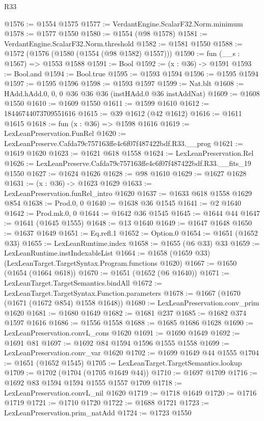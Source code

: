 \begin{lexlean}{R33}
\begin{coremodule}
@1576 := @1554 @1575
@1577 := VerdantEngine.ScalarF32.Norm.minimum
@1578 := @1577 @1550
@1580 := @1554 (@98 @1578)
@1581 := VerdantEngine.ScalarF32.Norm.threshold
@1582 := @1581 @1550
@1588 := @1572 (@1576 (@1580 (@1554 (@98 @1582) @1557)))
@1590 := fun (__s : @1567) => @1553 @1588
@1591 := Bool
@1592 := (x : @36) -> @1591
@1593 := Bool.and
@1594 := Bool.true
@1595 := @1593 @1594
@1596 := @1595 @1594
@1597 := @1595 @1596
@1598 := @1593 @1597
@1599 := Nat.blt
@1608 := HAdd.hAdd.{0, 0, 0} @36 @36 @36 (instHAdd.{0} @36 instAddNat)
@1609 := @1608 @1550
@1610 := @1609 @1550
@1611 := @1599 @1610
@1612 := 18446744073709551616
@1615 := @39 @1612 (@42 @1612)
@1616 := @1611 @1615
@1618 := fun (x : @36) => @1598 @1616
@1619 := LexLeanPreservation.FunRel
@1620 := LexLeanPreserve.Cafda79c757163ffe4c6f07f487422bdf.R33.__prog
@1621 := @1619 @1620
@1623 := @1621 @618 @1558
@1624 := LexLeanPreservation.Rel
@1626 := LexLeanPreserve.Cafda79c757163ffe4c6f07f487422bdf.R33.__fits_19 @1550
@1627 := @1624 @1626
@1628 := @98 @1610
@1629 := @1627 @1628
@1631 := (x : @36) -> @1623 @1629
@1633 := LexLeanPreservation.funRel_intro @1620
@1637 := @1633 @618 @1558 @1629 @854
@1638 := Prod.{0, 0}
@1640 := @1638 @36 @1545
@1641 := @2 @1640
@1642 := Prod.mk.{0, 0}
@1644 := @1642 @36 @1545
@1645 := @1644 @44
@1647 := @1641 (@1645 @1555)
@1648 := @13 @1640
@1649 := @1647 @1648
@1650 := @1637 @1649
@1651 := Eq.refl.{1}
@1652 := Option.{0}
@1654 := @1651 (@1652 @33)
@1655 := LexLeanRuntime.index
@1658 := @1655 (@6 @33) @33
@1659 := LexLeanRuntime.instIndexableList
@1664 := @1658 (@1659 @33) (LexLeanTarget.TargetSyntax.Program.functions @1620)
@1667 := @1650 (@1654 (@1664 @618))
@1670 := @1651 (@1652 (@6 @1640))
@1671 := LexLeanTarget.TargetSemantics.bindAll
@1672 := LexLeanTarget.TargetSyntax.Function.parameters
@1678 := @1667 (@1670 (@1671 (@1672 @854) @1558 @1648))
@1680 := LexLeanPreservation.conv_prim @1620
@1681 := @1680 @1649
@1682 := @1681 @237
@1685 := @1682 @374 @1597 @1616
@1686 := @1556 @1558
@1688 := @1685 @1686 @1628
@1690 := LexLeanPreservation.convL_cons @1620
@1691 := @1690 @1649
@1692 := @1691 @81
@1697 := @1692 @84 @1594 @1596 @1555 @1558
@1699 := LexLeanPreservation.conv_var @1620
@1702 := @1699 @1649 @44 @1555
@1704 := @1651 (@1652 @1545)
@1705 := LexLeanTarget.TargetSemantics.lookup
@1709 := @1702 (@1704 (@1705 @1649 @44))
@1710 := @1697 @1709
@1716 := @1692 @83 @1594 @1594 @1555 @1557 @1709
@1718 := LexLeanPreservation.convL_nil @1620
@1719 := @1718 @1649
@1720 := @1716 @1719
@1721 := @1710 @1720
@1722 := @1688 @1721
@1723 := LexLeanPreservation.prim_natAdd
@1724 := @1723 @1550

\end{coremodule}
\end{lexlean}
